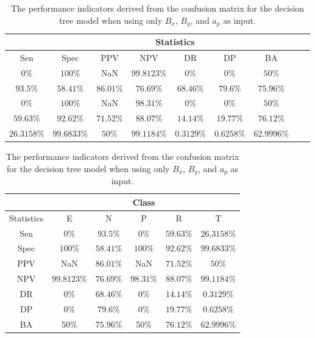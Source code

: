\begin{table}[!ht]
	\centering
	\begin{tabular}{|c|c|c|c|c|c|c|c|c|}
		\hline
		 & \multicolumn{7}{c|}{Statistics} \\ \hline
		Sen & Spec & PPV & NPV & DR & DP & BA \\ \hline
		$0\%$ & $100\%$ & NaN & $99.8123\%$ & $0\%$ & $0\%$ & $50\%$ \\ \hline
		$93.5\%$ & $58.41\%$ & $86.01\%$ & $76.69\%$ & $68.46\%$ & $79.6\%$ & $75.96\%$ \\ \hline
		$0\%$ & $100\%$ & NaN & $98.31\%$ & $0\%$ & $0\%$ & $50\%$ \\ \hline
		$59.63\%$ & $92.62\%$ & $71.52\%$ & $88.07\%$ & $14.14\%$ & $19.77\%$ & $76.12\%$ \\ \hline
		$26.3158\%$ & $99.6833\%$ & $50\%$ & $99.1184\%$ & $0.3129\%$ & $0.6258\%$ & $62.9996\%$ \\ \hline
	\end{tabular}
	\caption{The performance indicators derived from the confusion matrix for the decision tree model when using only $B_{x}$, $B_{y}$, and $a_{p}$ as input.}
	\label{tab:cs:xyap:C5.0}
\end{table}

\begin{table}[!ht]
	\centering
	\begin{tabular}{|c|c|c|c|c|c|}
		\hline
		 & \multicolumn{5}{c|}{Class} \\ \hline
		Statistics & E & N & P & R & T \\ \hline
		Sen & $0\%$ & $93.5\%$ & $0\%$ & $59.63\%$ & $26.3158\%$ \\ \hline
		Spec & $100\%$ & $58.41\%$ & $100\%$ & $92.62\%$ & $99.6833\%$ \\ \hline
		PPV & NaN & $86.01\%$ & NaN & $71.52\%$ & $50\%$ \\ \hline
		NPV & $99.8123\%$ & $76.69\%$ & $98.31\%$ & $88.07\%$ & $99.1184\%$ \\ \hline
		DR & $0\%$ & $68.46\%$ & $0\%$ & $14.14\%$ & $0.3129\%$ \\ \hline
		DP & $0\%$ & $79.6\%$ & $0\%$ & $19.77\%$ & $0.6258\%$ \\ \hline
		BA & $50\%$ & $75.96\%$ & $50\%$ & $76.12\%$ & $62.9996\%$ \\ \hline
	\end{tabular}
	\caption{The performance indicators derived from the confusion matrix for the decision tree model when using only $B_{x}$, $B_{y}$, and $a_{p}$ as input.}
	\label{tab:cs:reverse:xyap:C5.0}
\end{table}

